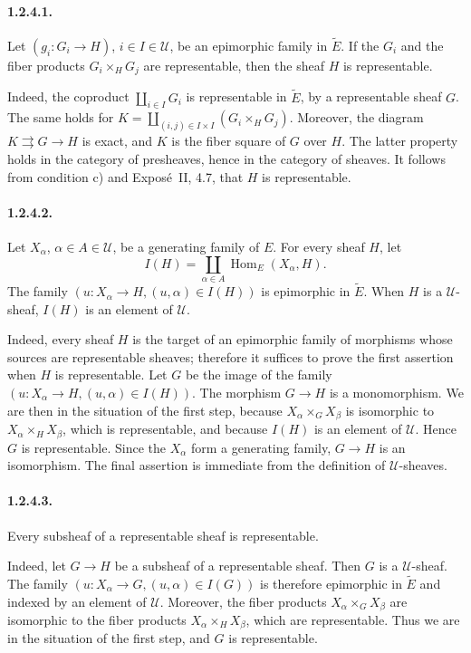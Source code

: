 \documentclass[11pt]{article}
\newcommand{\U}{\mathcal{U}}
\newcommand{\Hom}{\operatorname{Hom}}
\begin{document}
\paragraph{1.2.4.1.} Let \((g_i:G_i\to H)\), \(i\in I\in\U\), be an epimorphic family in \(\widetilde E\). If the \(G_i\) and the fiber products \(G_i\times_HG_j\) are representable, then the sheaf \(H\) is representable.

Indeed, the coproduct \(\coprod_{i\in I}G_i\) is representable in \(\widetilde E\), by a representable sheaf \(G\). The same holds for \(K=\coprod_{(i,j)\in I\times I}(G_i\times_HG_j)\). Moreover, the diagram \(K\rightrightarrows G\to H\) is exact, and \(K\) is the fiber square of \(G\) over \(H\). The latter property holds in the category of presheaves, hence in the category of sheaves. It follows from condition c) and Expos\'e~II, 4.7, that \(H\) is representable.

\paragraph{1.2.4.2.} Let \(X_\alpha\), \(\alpha\in A\in\U\), be a generating family of \(E\). For every sheaf \(H\), let
\[
I(H)=\coprod_{\alpha\in A}\Hom_E(X_\alpha,H).
\]
The family \((u:X_\alpha\to H,(u,\alpha)\in I(H))\) is epimorphic in \(\widetilde E\). When \(H\) is a \(\U\)-sheaf, \(I(H)\) is an element of \(\U\).

Indeed, every sheaf \(H\) is the target of an epimorphic family of morphisms whose sources are representable sheaves; therefore it suffices to prove the first assertion when \(H\) is representable. Let \(G\) be the image of the family \((u:X_\alpha\to H,(u,\alpha)\in I(H))\). The morphism \(G\to H\) is a monomorphism. We are then in the situation of the first step, because \(X_\alpha\times_GX_\beta\) is isomorphic to \(X_\alpha\times_HX_\beta\), which is representable, and because \(I(H)\) is an element of \(\U\). Hence \(G\) is representable. Since the \(X_\alpha\) form a generating family, \(G\to H\) is an isomorphism. The final assertion is immediate from the definition of \(\U\)-sheaves.

\paragraph{1.2.4.3.} Every subsheaf of a representable sheaf is representable.

Indeed, let \(G\to H\) be a subsheaf of a representable sheaf. Then \(G\) is a \(\U\)-sheaf. The family \((u:X_\alpha\to G,(u,\alpha)\in I(G))\) is therefore epimorphic in \(\widetilde E\) and indexed by an element of \(\U\). Moreover, the fiber products \(X_\alpha\times_GX_\beta\) are isomorphic to the fiber products \(X_\alpha\times_HX_\beta\), which are representable. Thus we are in the situation of the first step, and \(G\) is representable.
\end{document}
